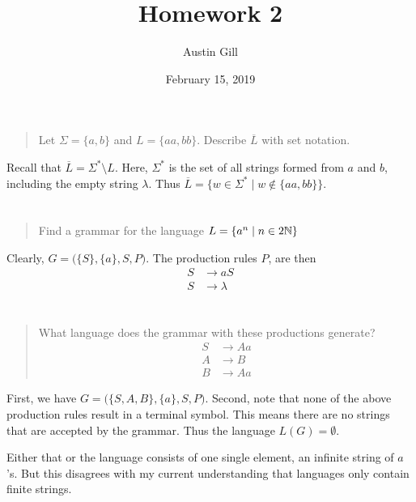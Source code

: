 \documentclass{article}
\title{Homework 2}
\author{Austin Gill}
\date{February 15, 2019}
\begin{document}
\maketitle

\section{}
\begin{quote}
    Let $\Sigma = \{a, b\}$ and $L = \{aa, bb\}$. Describe $\overline L$ with set notation.
\end{quote}

Recall that $\overline L = \Sigma^* \setminus L$. Here, $\Sigma^*$ is the set of all strings formed
from $a$ and $b$, including the empty string $\lambda$. Thus $\overline L = \big \{w \in \Sigma^*
    \mid w \notin \{aa, bb\} \big \}$.

\section{}
\begin{quote}
    Find a grammar for the language $L = \{ a^n \mid n \in 2\mathbb{N} \}$
\end{quote}

Clearly, $G = \big(\{S\}, \{a\}, S, P\big)$. The production rules $P$, are then
\begin{align*}
    S & \to aS      \\
    S & \to \lambda
\end{align*}

\section{}
\begin{quote}
    What language does the grammar with these productions generate?
    \begin{align*}
        S & \to Aa \\
        A & \to B  \\
        B & \to Aa
    \end{align*}
\end{quote}

First, we have $G = \big(\{S, A, B\}, \{a\}, S, P\big)$. Second, note that none of the above
production rules result in a terminal symbol. This means there are no strings that are accepted by
the grammar. Thus the language $L(G) = \emptyset$.

Either that or the language consists of one single element, an infinite string of $a$'s. But this
disagrees with my current understanding that languages only contain finite strings.
\end{document}
